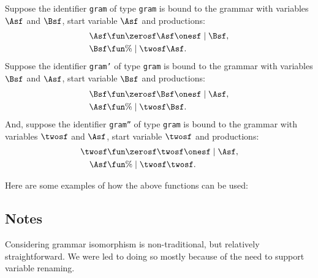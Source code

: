 Suppose the identifier \texttt{gram} of type \texttt{gram} is bound to the
grammar with variables $\Asf$ and $\Bsf$, start variable $\Asf$ and
productions:
\begin{align*}
\Asf &\fun \zerosf\Asf\onesf \mid \Bsf , \\
\Bsf &\fun \% \mid \twosf\Asf .
\end{align*}
Suppose the identifier \texttt{gram'} of type \texttt{gram} is bound to
the grammar with variables $\Bsf$ and $\Asf$, start variable $\Bsf$
and productions:
\begin{align*}
\Bsf &\fun \zerosf\Bsf\onesf \mid \Asf , \\ \Asf &\fun \% \mid
\twosf\Bsf .
\end{align*}
And, suppose the identifier \texttt{gram''} of type \texttt{gram} is bound
to the grammar with variables $\twosf$ and $\Asf$, start variable
$\twosf$ and productions:
\begin{align*}
\twosf &\fun \zerosf\twosf\onesf \mid \Asf , \\
\Asf &\fun \% \mid \twosf\twosf .
\end{align*}

Here are some examples of how the above functions can be used:


\subsection{Notes}

Considering grammar isomorphism is non-traditional, but relatively
straightforward.  We were led to doing so mostly because of the need to
support variable renaming.

